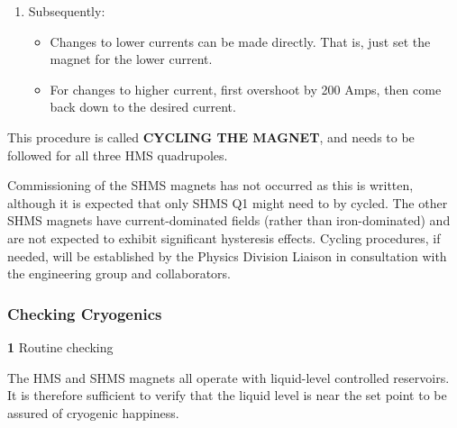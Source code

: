 {\begin{enumerate}
{     This means: to change the polarity and set the current go to 950 Amps,
     down to zero, back up to 950 Amps, and down to the desired setting.}
  \item{Subsequently:
  \begin{itemize}
     \item{Changes to lower currents can be made directly. 
        That is, just set the magnet for the lower current.}
     \item{For changes to higher current, first overshoot 
        by 200 Amps, then come back down to the desired current.}
  \end{itemize}}
\end{enumerate} 
This procedure is called \textbf{CYCLING THE MAGNET}, and needs to be  followed for all three HMS quadrupoles.

Commissioning of the SHMS magnets has not occurred as this is written, although it
is expected that only SHMS Q1 might need to by cycled. The other SHMS magnets have
current-dominated fields (rather than iron-dominated) and are not expected to 
exhibit significant hysteresis effects. Cycling procedures, if needed, will be established by
the Physics Division Liaison in consultation with the engineering group and collaborators.

\subsubsection{Checking Cryogenics}

\begin{description}
\item{\bf 1}\hskip0.1in Routine checking
\item{}\hskip0.3in The HMS and SHMS magnets all operate with liquid-level controlled
reservoirs. It is therefore sufficient to verify that the liquid level
is near the set point to be assured of cryogenic happiness.
\end{description}

}
